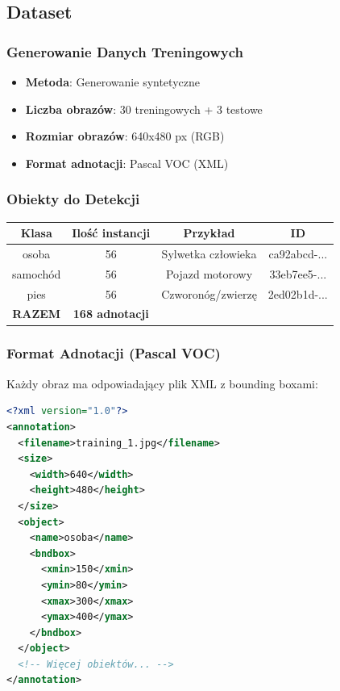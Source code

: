 \subsection{Dataset}

\subsubsection{Generowanie Danych Treningowych}

\begin{itemize}
	\item \textbf{Metoda}: Generowanie syntetyczne
	\item \textbf{Liczba obrazów}: 30 treningowych + 3 testowe
	\item \textbf{Rozmiar obrazów}: 640x480 px (RGB)
	\item \textbf{Format adnotacji}: Pascal VOC (XML)
\end{itemize}

\subsubsection{Obiekty do Detekcji}

\begin{center}
	\begin{tabular}{|c|c|c|c|}
		\hline
		\textbf{Klasa} & \textbf{Ilość instancji} & \textbf{Przykład} & \textbf{ID} \\
		\hline
		osoba & 56 & Sylwetka człowieka & ca92abcd-... \\
		samochód & 56 & Pojazd motorowy & 33eb7ee5-... \\
		pies & 56 & Czworonóg/zwierzę & 2ed02b1d-... \\
		\hline
		\textbf{RAZEM} & \textbf{168 adnotacji} & & \\
		\hline
	\end{tabular}
\end{center}

\subsubsection{Format Adnotacji (Pascal VOC)}

Każdy obraz ma odpowiadający plik XML z bounding boxami:

\begin{lstlisting}[language=xml]
<?xml version="1.0"?>
<annotation>
  <filename>training_1.jpg</filename>
  <size>
    <width>640</width>
    <height>480</height>
  </size>
  <object>
    <name>osoba</name>
    <bndbox>
      <xmin>150</xmin>
      <ymin>80</ymin>
      <xmax>300</xmax>
      <ymax>400</ymax>
    </bndbox>
  </object>
  <!-- Więcej obiektów... -->
</annotation>
\end{lstlisting}

